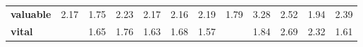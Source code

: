 \begin{tabular}{|l|c|c|c|c|c|c|c|c|c|c|c|}
\textbf{valuable} & \cellcolor{green!43} 2.17 & \cellcolor{green!31} 1.75 & \cellcolor{green!44} 2.23 & \cellcolor{green!43} 2.17 & \cellcolor{green!42} 2.16 & \cellcolor{green!43} 2.19 & \cellcolor{green!32} 1.79 & \cellcolor{green!66} 3.28 & \cellcolor{green!51} 2.52 & \cellcolor{green!36} 1.94 & \cellcolor{green!48} 2.39 \\
\textbf{vital} &  & \cellcolor{green!27} 1.65 & \cellcolor{green!31} 1.76 & \cellcolor{green!27} 1.63 & \cellcolor{green!28} 1.68 & \cellcolor{green!25} 1.57 &  & \cellcolor{green!34} 1.84 & \cellcolor{green!55} 2.69 & \cellcolor{green!46} 2.32 & \cellcolor{green!26} 1.61 \\
\bottomrule
\end{tabular}
